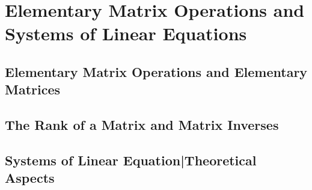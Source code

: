 \chapter{Elementary Matrix Operations and Systems of Linear Equations}
\thispagestyle{empty}
\newpage

\section{Elementary Matrix Operations and Elementary Matrices}



\vspace{12pt}

\setcounter{Exercise}{11}



\section{The Rank of a Matrix and Matrix Inverses}



\vspace{12pt}

\setcounter{Exercise}{2}


\vspace{12pt}



\vspace{12pt}



\vspace{12pt}



\vspace{12pt}



\vspace{12pt}

\setcounter{Exercise}{13}


\vspace{12pt}

\setcounter{Exercise}{16}



\section{Systems of Linear Equation|Theoretical Aspects}



\vspace{12pt}



\vspace{12pt}



\vspace{12pt}

\setcounter{Exercise}{7}


\vspace{12pt}

\setcounter{Exercise}{9}


